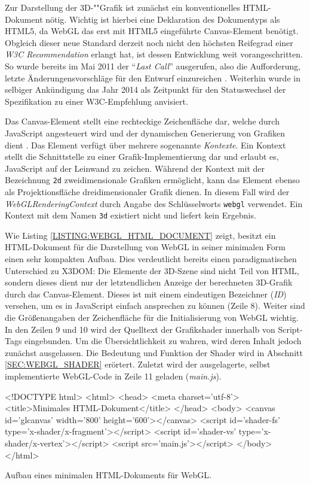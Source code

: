 Zur Darstellung der 3D-""Grafik ist zunächst ein konventionelles HTML-Dokument nötig. Wichtig ist hierbei eine Deklaration des Dokumentyps als HTML5, da WebGL das erst mit HTML5 eingeführte Canvas-Element benötigt.
Obgleich dieser neue Standard derzeit noch nicht den höchsten Reifegrad einer \emph{W3C Recommendation} erlangt hat, ist dessen Entwicklung weit vorangeschritten. So wurde bereits im Mai 2011 der \enquote{\emph{Last Call}} ausgerufen, also die Aufforderung, letzte Änderungensvorschläge für den Entwurf einzureichen \autocite{W3C_HTML5_LAST_CALL_TARGET_2014}. Weiterhin wurde in selbiger Ankündigung das Jahr 2014 als Zeitpunkt für den Statuswechsel der Spezifikation zu einer W3C-Empfehlung anvisiert.

Das Canvas-Element stellt eine rechteckige Zeichenfläche dar, welche durch JavaScript angesteuert wird und der dynamischen Generierung von Grafiken dient \autocite{W3C_HTML5_SPEC_WORKING_DRAFT}.
Das Element verfügt über mehrere sogenannte \emph{Kontexte}. Ein Kontext stellt die Schnittstelle zu einer Grafik-Implementierung dar und erlaubt es, JavaScript auf der Leinwand zu zeichen. Während der Kontext mit der Bezeichnung \texttt{2d} zweidimensionale Grafiken ermöglicht, kann das Element ebenso als Projektionsfläche dreidimensionaler Grafik dienen. In diesem Fall wird der \emph{WebGLRenderingContext} durch Angabe des Schlüsselworts \texttt{webgl} verwendet. Ein Kontext mit dem Namen \texttt{3d} existiert nicht und liefert kein Ergebnis.

Wie Listing \ref{LISTING:WEBGL_HTML_DOCUMENT} zeigt, besitzt ein HTML-Dokument für die Darstellung von WebGL in seiner minimalen Form einen sehr kompakten Aufbau. Dies verdeutlicht bereits einen paradigmatischen Unterschied zu X3DOM: Die Elemente der 3D-Szene sind nicht Teil von HTML, sondern dieses dient nur der letztendlichen Anzeige der berechneten 3D-Grafik durch das Canvas-Element. Dieses ist mit einem eindeutigen Bezeichner (\emph{ID}) versehen, um es in JavaScript einfach ansprechen zu können (Zeile 8). Weiter sind die Größenangaben der Zeichenfläche für die Initialisierung von WebGL wichtig.
In den Zeilen 9 und 10 wird der Quelltext der Grafikshader innerhalb von Script-Tags eingebunden. Um die Übersichtlichkeit zu wahren, wird deren Inhalt jedoch zunächst ausgelassen. Die Bedeutung und Funktion der Shader wird in Abschnitt \ref{SEC:WEBGL_SHADER} erörtert. Zuletzt wird der ausgelagerte, selbst implementierte WebGL-Code in Zeile 11 geladen (\emph{main.js}).

\smallskip
\begin{listing}[ht]
\begin{htmlcode}
<!DOCTYPE html>
<html>
	<head>
		<meta charset='utf-8'>
		<title>Minimales HTML-Dokument</title>
	</head>
	<body>
		<canvas id='glcanvas' width='800' height='600'></canvas>
		<script id='shader-fs' type='x-shader/x-fragment'></script>
		<script id='shader-vs' type='x-shader/x-vertex'></script>
		<script src='main.js'></script>
	</body>
</html>
\end{htmlcode}
\caption{Aufbau eines minimalen HTML-Dokuments für WebGL.}
\label{LISTING:WEBGL_HTML_DOCUMENT}
\end{listing}

